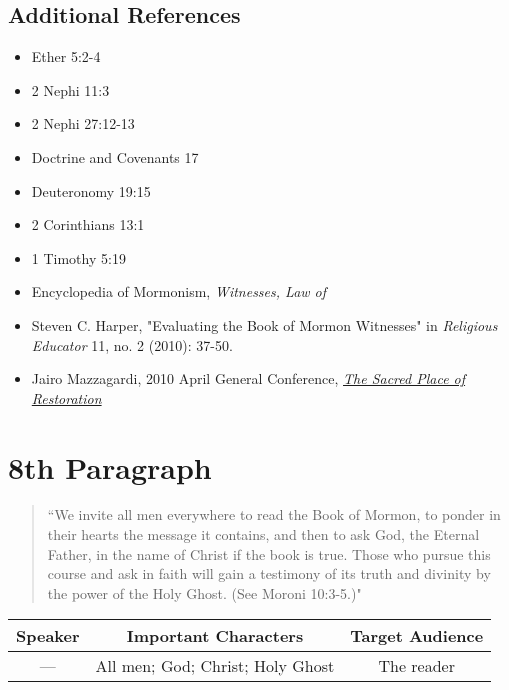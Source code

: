 \documentclass[12pt]{report}
\begin{document}
\subsection{Additional References\label{intro:references7}}
\begin{itemize}
\item Ether 5:2-4
\item 2 Nephi 11:3
\item 2 Nephi 27:12-13
\item Doctrine and Covenants 17
\item Deuteronomy 19:15
\item 2 Corinthians 13:1
\item 1 Timothy 5:19
\item Encyclopedia of Mormonism, \emph{Witnesses, Law of}
\item Steven C. Harper, "Evaluating the Book of Mormon Witnesses" in \emph{Religious Educator} 11, no. 2 (2010): 37-50.
\item Jairo Mazzagardi, 2010 April General Conference, \href{https://www.lds.org/general-conference/2016/04/the-sacred-place-of-restoration?lang=eng}{\emph{The Sacred Place of Restoration}}
\end{itemize}

\section{8th Paragraph\label{intro:8th}}
\begin{center}
\begin{quote}
``We invite all men everywhere to read the Book of Mormon, to ponder in their hearts the message it contains, and then to ask God, the Eternal Father, in the name of Christ if the book is true.  Those who pursue this course and ask in faith will gain a testimony of its truth and divinity by the power of the Holy Ghost. (See Moroni 10:3-5.)"
\end{quote}
\end{center}

\begin{table}[h!]
\centering
\label{table:intro8}
\begin{tabular*}{\textwidth}{c @{\extracolsep{\fill}}cc}
Speaker & Important Characters & Target Audience \\
\hline
\rule{0pt}{3ex}--- & All men; God; Christ; Holy Ghost & The reader 
\end{tabular*}
\end{table}
\end{document}
